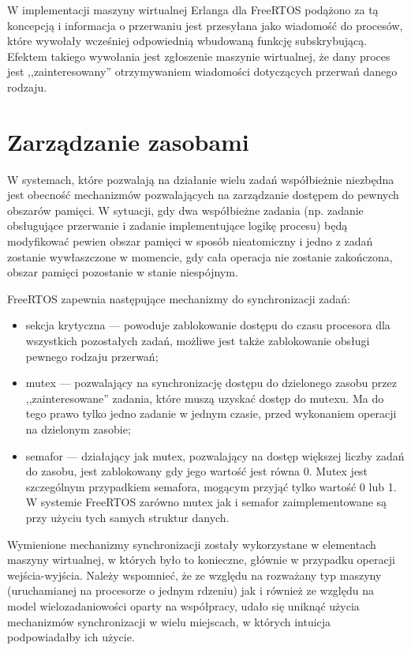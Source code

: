 W implementacji maszyny wirtualnej Erlanga dla FreeRTOS podążono za tą koncepcją i informacja o przerwaniu jest przesyłana jako wiadomość do procesów, które wywołały wcześniej odpowiednią wbudowaną funkcję subskrybującą. Efektem takiego wywołania jest zgłoszenie maszynie wirtualnej, że dany proces jest ,,zainteresowany'' otrzymywaniem wiadomości dotyczących przerwań danego rodzaju. 

\section{Zarządzanie zasobami}
\label{sec:rtosZasoby}

W systemach, które pozwalają na działanie wielu zadań współbieżnie niezbędna jest obecność mechanizmów pozwalających na 
zarządzanie dostępem do pewnych obszarów pamięci. W sytuacji, gdy dwa współbieżne zadania (np. zadanie obsługujące przerwanie i 
zadanie implementujące logikę procesu) będą modyfikować pewien obszar pamięci w sposób nieatomiczny i jedno z zadań zostanie wywłaszczone w momencie, gdy cała operacja nie zostanie zakończona, obszar pamięci pozostanie w stanie niespójnym.

FreeRTOS zapewnia następujące mechanizmy do synchronizacji zadań:
\begin{itemize}
\item sekcja krytyczna --- powoduje zablokowanie dostępu do czasu procesora dla wszystkich pozostałych zadań, możliwe jest także zablokowanie obsługi pewnego rodzaju przerwań;
\item mutex --- pozwalający na synchronizację dostępu do dzielonego zasobu przez ,,zainteresowane'' zadania, które muszą uzyskać dostęp do mutexu. Ma do tego prawo tylko jedno zadanie w jednym czasie, przed wykonaniem operacji na dzielonym zasobie;
\item semafor --- działający jak mutex, pozwalający na dostęp większej liczby zadań do zasobu, jest zablokowany gdy jego wartość jest równa 0. Mutex jest szczególnym przypadkiem semafora, mogącym przyjąć tylko wartość 0 lub 1. W systemie FreeRTOS zarówno mutex jak i semafor zaimplementowane są przy użyciu tych samych struktur danych.
\end{itemize}

Wymienione mechanizmy synchronizacji zostały wykorzystane w elementach maszyny wirtualnej, w których było to konieczne, głównie w przypadku operacji wejścia-wyjścia.
Należy wspomnieć, że ze względu na rozważany typ maszyny (uruchamianej na procesorze o jednym rdzeniu) jak i również ze względu na model wielozadaniowości oparty na współpracy, udało się uniknąć użycia mechanizmów synchronizacji w wielu miejscach, w których intuicja podpowiadałby ich użycie.

